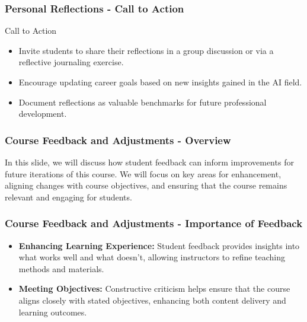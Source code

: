 \documentclass[aspectratio=169]{beamer}
\begin{document}
\begin{frame}[fragile]
    \frametitle{Personal Reflections - Call to Action}
    \begin{block}{Call to Action}
        \begin{itemize}
            \item Invite students to share their reflections in a group discussion or via a reflective journaling exercise.
            \item Encourage updating career goals based on new insights gained in the AI field.
            \item Document reflections as valuable benchmarks for future professional development.
        \end{itemize}
    \end{block}
\end{frame}

\begin{frame}[fragile]
    \frametitle{Course Feedback and Adjustments - Overview}
    In this slide, we will discuss how student feedback can inform improvements for future iterations of this course. 
    We will focus on key areas for enhancement, aligning changes with course objectives, and ensuring that the course remains relevant and engaging for students.
\end{frame}

\begin{frame}[fragile]
    \frametitle{Course Feedback and Adjustments - Importance of Feedback}
    \begin{itemize}
        \item \textbf{Enhancing Learning Experience:} 
        Student feedback provides insights into what works well and what doesn’t, allowing instructors to refine teaching methods and materials.
        
        \item \textbf{Meeting Objectives:} 
        Constructive criticism helps ensure that the course aligns closely with stated objectives, enhancing both content delivery and learning outcomes.
    \end{itemize}
\end{frame}
\end{document}
